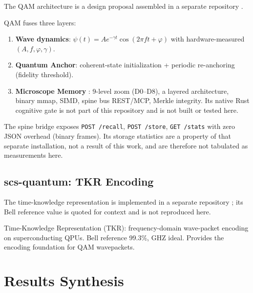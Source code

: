 \documentclass[sigconf,anonymous=false]{acmart}
\begin{document}
The QAM architecture is a design proposal assembled in a separate repository \cite{QAM}.
\label{sec:qam}

QAM fuses three layers:
\begin{enumerate}
\item \textbf{Wave dynamics}: $\psi(t) = A e^{-\gamma t} \cos(2\pi f t + \varphi)$ with hardware-measured $(A,f,\varphi,\gamma)$.
\item \textbf{Quantum Anchor}: coherent-state initialization + periodic re-anchoring (fidelity threshold).
\item \textbf{Microscope Memory} \cite{MicroscopeMemory}: 9-level zoom (D0--D8), a layered architecture, binary mmap, SIMD, spine bus REST/MCP, Merkle integrity. Its native Rust cognitive gate is not part of this repository and is not built or tested here.
\end{enumerate}

The spine bridge exposes \texttt{POST /recall}, \texttt{POST /store}, \texttt{GET /stats} with zero JSON overhead (binary frames). Its storage statistics are a property of that separate installation, not a result of this work, and are therefore not tabulated as measurements here.

\subsection{scs-quantum: TKR Encoding}

The time-knowledge representation is implemented in a separate repository
\cite{scsQuantum}; its Bell reference value is quoted for context and is not reproduced here.

Time-Knowledge Representation (TKR): frequency-domain wave-packet encoding on superconducting QPUs. Bell reference 99.3\%, GHZ ideal. Provides the encoding foundation for QAM wavepackets.

\section{Results Synthesis}
\end{document}
